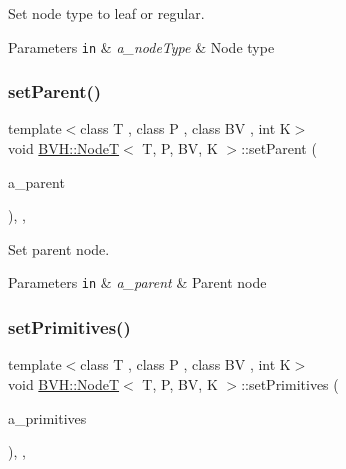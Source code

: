 Set node type to leaf or regular. 


\begin{DoxyParams}[1]{Parameters}
\mbox{\tt in}  & {\em a\+\_\+node\+Type} & Node type \\
\hline
\end{DoxyParams}
\mbox{\label{classBVH_1_1NodeT_a92db0ab2d61c76469600478fddd04edc}} 
\subsubsection{\texorpdfstring{set\+Parent()}{setParent()}}
{\footnotesize\ttfamily template$<$class T , class P , class BV , int K$>$ \\
void \hyperlink{classBVH_1_1NodeT}{B\+V\+H\+::\+NodeT}$<$ T, P, BV, K $>$\+::set\+Parent (\begin{DoxyParamCaption}\item[{const \hyperlink{classBVH_1_1NodeT_a008f5c2c53adb1f5730d8478b48529b1}{Node\+Ptr} \&}]{a\+\_\+parent }\end{DoxyParamCaption})\hspace{0.3cm}{\ttfamily [inline]}, {\ttfamily [protected]}, {\ttfamily [noexcept]}}



Set parent node. 


\begin{DoxyParams}[1]{Parameters}
\mbox{\tt in}  & {\em a\+\_\+parent} & Parent node \\
\hline
\end{DoxyParams}
\mbox{\label{classBVH_1_1NodeT_a2c9c3d3a83b3c1895c8f89b2bbd62e81}} 
\subsubsection{\texorpdfstring{set\+Primitives()}{setPrimitives()}}
{\footnotesize\ttfamily template$<$class T , class P , class BV , int K$>$ \\
void \hyperlink{classBVH_1_1NodeT}{B\+V\+H\+::\+NodeT}$<$ T, P, BV, K $>$\+::set\+Primitives (\begin{DoxyParamCaption}\item[{const \hyperlink{classBVH_1_1NodeT_a19cce6e7fbe85eccb4a3718dd69f49b7}{Primitive\+List} \&}]{a\+\_\+primitives }\end{DoxyParamCaption})\hspace{0.3cm}{\ttfamily [inline]}, {\ttfamily [protected]}, {\ttfamily [noexcept]}}



